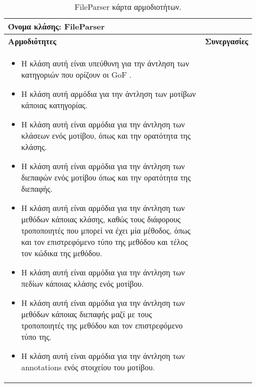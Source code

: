 \begin{table}[H]
    \centering
    \begin{tabular}{|p{10cm}|p{5cm}|}
        \hline
        \multicolumn{2}{|l|}{Όνομα κλάσης: FileParser} \\
        \hline
        \textbf{Αρμοδιότητες} & \textbf{Συνεργασίες} \\
        \hline
        \begin{itemize}
            \item Η κλάση αυτή είναι υπεύθυνη για την άντληση των κατηγοριών που ορίζουν οι GoF \cite{GoF}.
            \item Η κλάση αυτή αρμόδια για την άντληση των μοτίβων κάποιας κατηγορίας.
            \item Η κλάση αυτή είναι αρμόδια για την άντληση των κλάσεων ενός μοτίβου, όπως και την ορατότητα της κλάσης.
            \item Η κλάση αυτή είναι αρμόδια για την άντληση των διεπαφών ενός μοτίβου όπως και την ορατότητα της διεπαφής.
            \item Η κλάση αυτή είναι αρμόδια για την άντληση των μεθόδων κάποιας κλάσης, καθώς τους διάφορους τροποποιητές που μπορεί 
            να έχει μία μέθοδος, όπως και τον επιστρεφόμενο τύπο της μεθόδου και τέλος τον κώδικα της μεθόδου.
            \item Η κλάση αυτή είναι αρμόδια για την άντληση των πεδίων κάποιας κλάσης ενός μοτίβου.
            \item Η κλάση αυτή είναι αρμόδια για την άντληση των μεθόδων κάποιας διεπαφής μαζί με τους 
            τροποποιητές της μεθόδου και τον επιστρεφόμενο τύπο της.
            \item Η κλάση αυτή είναι αρμόδια για την άντληση των annotations ενός στοιχείου του μοτίβου.
        \end{itemize} &   
         \\
        \hline
    \end{tabular}
    \caption{FileParser κάρτα αρμοδιοτήτων.}
    \label{tab:fileParserCRC}
\end{table}
